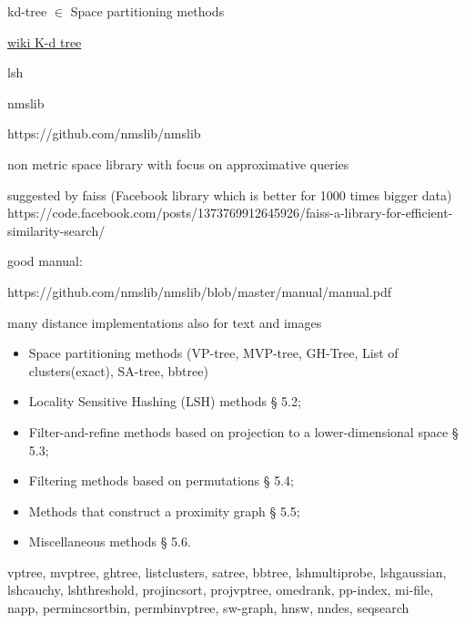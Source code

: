 \documentclass[xcolor=dvipsnames, aspectratio=1610]{beamer}
\newcommand{\gr}[1]{{\color{grcol}#1}}
\newcommand{\citeWork}[1]{ {\scriptsize{\color{Refcol} #1  \color{Black}}}}
\begin{document}
\begin{frame}{kd-tree $\in$ Space partitioning methods} 
\linespread{1}\Large{
\begin{minipage}{0.99\textwidth}  
\href{https://en.wikipedia.org/wiki/K-d_tree}{\citeWork{wiki K-d tree}} 
\end{minipage}}
\end{frame}



\begin{frame}{lsh} 
\linespread{1}\Large{
\begin{minipage}{0.99\textwidth}  
\end{minipage}}
\end{frame}



\begin{frame}{nmslib} 
\linespread{1}\small{
\begin{minipage}{0.99\textwidth}  
https://github.com/nmslib/nmslib

non metric space library with focus on approximative queries

suggested by faiss (Facebook library which is better for 1000 times bigger data)
https://code.facebook.com/posts/1373769912645926/faiss-a-library-for-efficient-similarity-search/

good manual:

https://github.com/nmslib/nmslib/blob/master/manual/manual.pdf

many distance implementations also for text and images

\begin{itemize}
\item  Space partitioning methods (VP-tree, MVP-tree, GH-Tree, List of clusters(exact), SA-tree, bbtree)
\item Locality Sensitive Hashing (LSH) methods § 5.2;
\item Filter-and-refine methods based on projection to a lower-dimensional space
§ 5.3;
\item Filtering methods based on permutations § 5.4;
\item Methods that construct a proximity graph § 5.5;
\item Miscellaneous methods § 5.6.
\end{itemize}
\gr{vptree,
mvptree,
ghtree,
list\textunderscore clusters,
satree,
bbtree,
lsh\textunderscore multiprobe,
lsh\textunderscore gaussian,
lsh\textunderscore cauchy,
lsh\textunderscore threshold,
proj\textunderscore incsort,
proj\textunderscore vptree,
omedrank,
pp-index,
mi-file,
napp,
perm\textunderscore incsort\textunderscore bin,
perm\textunderscore bin\textunderscore vptree,
sw-graph,
hnsw,
nndes,
seq\textunderscore search}
\end{minipage}
}
\end{frame}
\end{document}
